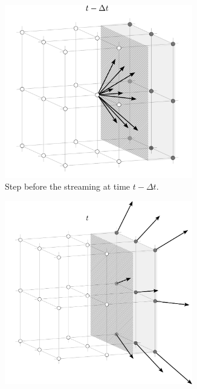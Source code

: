 \begin{figure}[h]
	\centering

	\begin{subfigure}{0.48\textwidth}
		\centering
		\includegraphics[width=0.9\textwidth, trim={0mm 0mm 0mm 0mm}]{figures/fwbba.pdf}
		\caption{Step before the streaming at time $t - \Delta t$.}
		\label{fig:bba}
	\end{subfigure}
	\begin{subfigure}{0.48\textwidth}
		\centering
		\includegraphics[width=0.9\textwidth, trim={0mm 0mm 0mm 0mm}]{figures/fwbbb.pdf}

\end{subfigure}
\end{figure}

